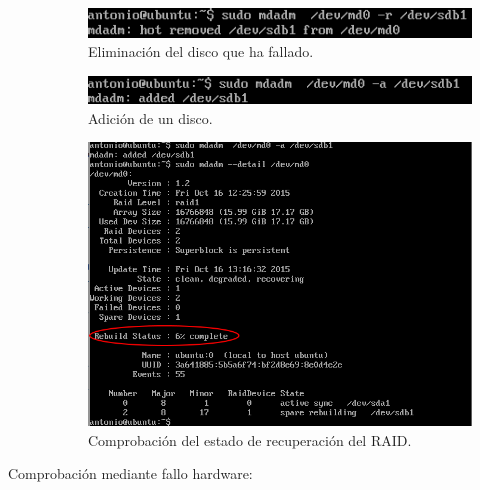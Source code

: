 \begin{description}
            \begin{figure}[H]
                \begin{center}
                    \includegraphics[scale=0.8]{Imagenes/remove}
                    \caption{Eliminación del disco que ha fallado.}
                    \label{fig6}
                \end{center}
            \end{figure}

            \begin{figure}[H]
                \begin{center}
                    \includegraphics[scale=0.8]{Imagenes/add}
                    \caption{Adición de un disco.}
                    \label{fig7}
                \end{center}
            \end{figure}

            \begin{figure}[H]
                \begin{center}
                    \includegraphics[scale=0.5]{Imagenes/estado_recuperacion}
                    \caption{Comprobación del estado de recuperación del RAID.}
                    \label{fig8}
                \end{center}
            \end{figure}
    \item[Comprobación mediante fallo hardware: ]


\end{description}
